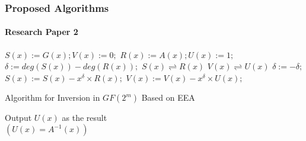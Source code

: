 \documentclass[12pt]{beamer}
\begin{document}
\begin{frame}
\frametitle{Proposed Algorithms}
\framesubtitle{Research Paper 2}
\begin{algorithm}[H]
\tiny
\label{euclid}
	\begin{algorithmic}
			\State $S(x) := G(x); V(x) := 0;$
			\State $R(x) := A(x); U(x) := 1;$
				\State $\delta := deg(S(x)) - deg(R(x));$
					\State $S(x)\rightleftharpoons R(x)$
					\State $V(x) \rightleftharpoons U(x)$
					\State $\delta := -\delta;$				
				\EndIf
				\State $S(x) := S(x) - x^{\delta} \times R(x);$
				\State $V(x) := V(x) - x^{\delta} \times U(x);$
			\EndWhile
		\EndProcedure
	\end{algorithmic}
	\caption{ Algorithm for Inversion in $GF(2^{m})$ Based on EEA}
\end{algorithm}
\scriptsize
Output $U(x)$ as the result\\
$(U(x) = A^{-1}(x))$
\end{frame}
\end{document}
